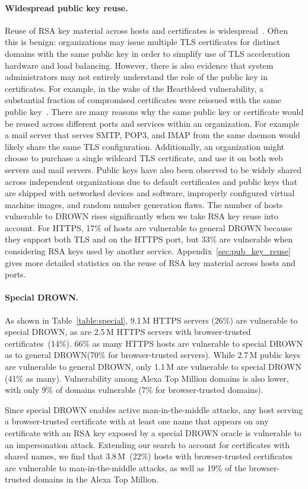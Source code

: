 \paragraph{Widespread public key reuse.}
Reuse of RSA key material across hosts and certificates is widespread~\cite{2016holz_analysis_tls-based_protocols_electronic_communication,weakkeys12}.
Often this is benign: organizations may issue multiple TLS certificates for
distinct domains with the same public key in order to
simplify use of TLS acceleration hardware and load balancing.
However, there is also evidence that system administrators may not entirely
understand the role of the public key in certificates. For example, in the wake
of the Heartbleed vulnerability, a substantial fraction of compromised
certificates were reissued with the same public
key~\cite{Durumeric:2014:MH:2663716.2663755}.  
\ifext
There are many reasons why the same public key or certificate would be reused
across different ports and services within an organization. For example a mail
server that serves SMTP, POP3, and IMAP from the same daemon would likely share
the same TLS configuration.  Additionally, an organization might choose to
purchase a single wildcard TLS certificate, and use it on both web servers and
mail servers. Public keys have also been observed to be widely shared across
independent organizations due to default certificates and public keys that are
shipped with networked devices and software, improperly configured virtual
machine images, and random number generation flaws.
\fi
The number of hosts vulnerable to DROWN rises significantly when we take RSA
key reuse into account. For HTTPS, 17\% of hosts are vulnerable to general
DROWN because they support both TLS and \ssltwo on the HTTPS port, but 33\% are vulnerable when considering RSA keys used by
another service.
\ifext Appendix~\ref{sec:pub_key_reuse}
gives more detailed statistics on the reuse of RSA key material across hosts
and ports. \fi

\paragraph{Special DROWN\@.}
As shown in Table~\ref{table:special},
9.1\,M HTTPS servers (26\%) are
vulnerable to special DROWN, as are 2.5\,M HTTPS servers with browser-trusted
certificates~(14\%). 66\% as many HTTPS hosts are vulnerable to special DROWN
as to general DROWN\@ (70\% for browser-trusted servers). While 2.7\,M public
keys are vulnerable to general DROWN, only 1.1\,M are vulnerable to special DROWN
(41\% as many). Vulnerability among Alexa Top Million domains is also lower, with
only 9\% of domains vulnerable (7\% for browser-trusted domains).

Since special DROWN enables active man-in-the-middle attacks, any host serving
a browser-trusted certificate with at least one name that appears on any
certificate with an RSA key exposed by a special DROWN oracle is vulnerable to an
impersonation attack. Extending our search to account for certificates with
shared names, we find that 3.8\,M~(22\%) hosts with browser-trusted certificates
are vulnerable to man-in-the-middle attacks, as well as 19\% of the
browser-trusted domains in the Alexa Top Million.
